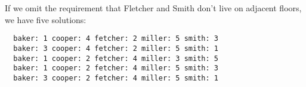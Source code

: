 \documentclass[a4paper,12pt]{article}
\begin{document}
If we omit the requirement that Fletcher and Smith don't live on
adjacent floors, we have five solutions:

\begin{verbatim}
  baker: 1 cooper: 4 fetcher: 2 miller: 5 smith: 3
  baker: 3 cooper: 4 fetcher: 2 miller: 5 smith: 1
  baker: 1 cooper: 2 fetcher: 4 miller: 3 smith: 5
  baker: 1 cooper: 2 fetcher: 4 miller: 5 smith: 3
  baker: 3 cooper: 2 fetcher: 4 miller: 5 smith: 1
\end{verbatim}
\end{document}
